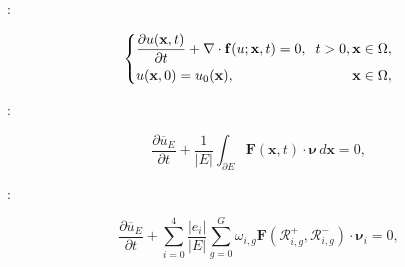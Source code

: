 \documentclass[usenames,dvipsnames,letterpaper,landscape,final]{slides}
\begin{document}
\begin{myslide}


:

\begin{equation}\label{eq:conservationlaw}
		  \left \{
		  \begin{alignedat}{2}
					 &\frac{\partial u(\mathbf{x},t)}{\partial t} + \nabla \cdot \mathbf{f}(u; \mathbf{x},t) = 0, \hspace{0.2cm} t>0,\, &&\mathbf{x} \in \Omega, \\ 
					 &u(\mathbf{x},0) = u_0(\mathbf{x}), \hspace{2.5cm} &&\mathbf{x} \in \Omega,
		  \end{alignedat}
		  \right .
\end{equation}

\vspace{20pt}

:

\begin{equation}
		  \frac{\partial \overline{u}_E}{\partial t} + \frac{1}{\lvert E \rvert}\int_{\partial E} \mathbf{F}(\mathbf{x},t) \cdot \pmb{\nu}\, d\mathbf{x} = 0,
\end{equation}

\vspace{20pt}

:

\begin{equation}\label{eq:fvdis}
		  \frac{\partial \overline{u}_{E}}{\partial t} + \sum_{i=0}^4\frac{\lvert e_i \rvert}{\lvert E \rvert}
		  \sum_{g=0}^G \omega_{i,g} \mathbf{F}(\mathcal{R}_{i,g}^+, \mathcal{R}_{i,g}^-)\cdot \pmb{\nu}_i = 0,
\end{equation}

\end{myslide}

\end{document}
